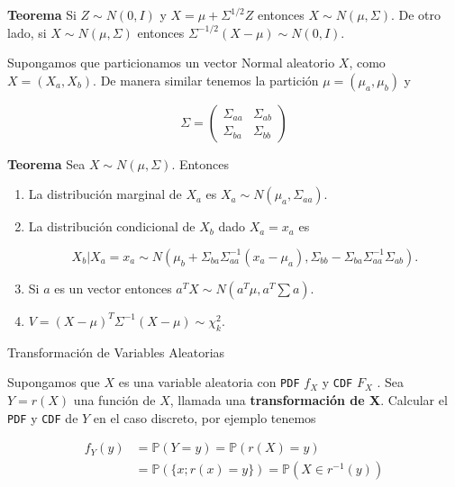 \documentclass{article}\usepackage[]{graphicx}\usepackage[]{color}
\begin{document}
\textbf{Teorema} Si $Z \sim N(0,I)$ y $X = \mu + \Sigma^{1/2}Z$ entonces $X \sim N(\mu, \Sigma)$. De otro lado, si $X \sim N(\mu, \Sigma)$ entonces $\Sigma^{-1/2}(X -\mu) \sim N(0,I)$.


\vspace{0.5cm}

Supongamos que particionamos un vector Normal aleatorio $X$, como $X = (X_a, X_b)$. De manera similar tenemos la partici\'on $\mu = (\mu_a, \mu_b)$ y

\vspace{0.3cm}


\[
\Sigma = \begin{pmatrix}
\Sigma_{aa} & \Sigma_{ab} \\
\Sigma_{ba} & \Sigma_{bb}
\end{pmatrix}
\]


\vspace{0.5cm}

\textbf{Teorema} Sea $X \sim N(\mu, \Sigma)$. Entonces

\begin{enumerate}
\item La distribuci\'on marginal de $X_a$ es $X_a \sim N(\mu_a, \Sigma_{aa})$.
\item La distribuci\'on condicional de $X_b$ dado $X_a = x_a$ es

\[
X_b|X_a = x_a \sim N(\mu_b + \Sigma_{ba}\Sigma_{aa}^{-1}(x_a - \mu_a), \Sigma_{bb} -\Sigma_{ba}\Sigma_{aa}^{-1}\Sigma_{ab}).
\]
\item Si $a$ es un vector entonces $a^{T}X \sim N(a^{T}\mu, a^{T}\sum a)$.
\item $V = (X -\mu)^{T}\Sigma^{-1}(X - \mu) \sim \chi_{k}^{2}$.
\end{enumerate}

\vspace{0.8cm}


{\Large  Transformaci\'on de  Variables Aleatorias}

\vspace{0.5cm}

Supongamos que $X$ es una variable aleatoria con \texttt{PDF} $f_X$ y \texttt{CDF} $F_X$ . Sea $Y = r(X)$ una funci\'on de $X$, llamada una \textbf{transformaci\'on de X}. Calcular el  \texttt{PDF}  y \texttt{CDF} de $Y$ en el caso discreto, por ejemplo tenemos

\begin{align*}
f_{Y}(y) &= \mathbb{P}(Y=y) = \mathbb{P}(r(X) =y)\\
& = \mathbb{P}(\{x; r(x) = y\}) = \mathbb{P}(X \in r^{-1}(y))
\end{align*}
\end{document}
